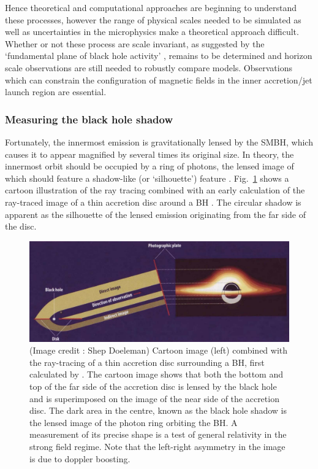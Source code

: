 Hence theoretical and computational approaches are beginning to understand these processes, however the range of physical scales needed to be simulated as well as uncertainties in the microphysics make a theoretical approach difficult. Whether or not these process are scale invariant, as suggested by the `fundamental plane of black hole activity' \citep{Merloni_2003}, remains to be determined and horizon scale observations are still needed to robustly compare models. Observations which can constrain the configuration of magnetic fields in the inner accretion/jet launch region are essential.

\subsubsection{Measuring the black hole shadow}

Fortunately, the innermost emission is gravitationally lensed by the SMBH, which causes it to appear magnified by several times its original size. In theory, the innermost orbit should be occupied by a ring of photons, the lensed image of which should feature a shadow-like (or `silhouette') feature \citep[e.g.][]{Johannsen_2010}. Fig.~\ref{fig:grmhd} shows a cartoon illustration of the ray tracing combined with an early calculation of the ray-traced image of a thin accretion disc around a BH \citep{Luminet_1979}. The circular shadow is apparent as the silhouette of the lensed emission originating from the far side of the disc. 



\begin{figure}[h!]
\includegraphics[width=\columnwidth]{Images/lensed_cartoon}
\caption{(Image credit : Shep Doeleman) Cartoon image (left) combined with the ray-tracing of a thin accretion disc surrounding a BH, first calculated by \citet{Luminet_1979}. The cartoon image shows that both the bottom and top of the far side of the accretion disc is lensed by the black hole and is superimposed on the image of the near side of the accretion disc. The dark area in the centre, known as the black hole shadow is the lensed image of the photon ring orbiting the BH. A measurement of its precise shape is a test of general relativity in the strong field regime. Note that the left-right asymmetry in the image is due to doppler boosting. \label{fig:grmhd}%
}
\end{figure}



